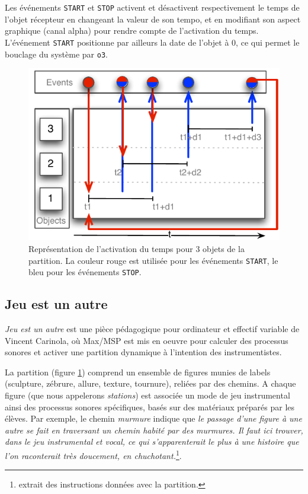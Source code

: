 \documentclass{article}
\newcommand{\OSC}[1]	{{\fontsize{9pt}{9pt} \selectfont\texttt{#1}}}
\begin{document}
Les événements \OSC{START} et \OSC{STOP} activent et désactivent respectivement le temps de l'objet récepteur en changeant la valeur de son tempo, et en modifiant son aspect graphique (canal alpha) pour rendre compte de l'activation du temps. L'événement \OSC{START} positionne par ailleurs la date de l'objet à 0, ce qui permet le bouclage du système par \OSC{o3}.
\begin{figure}[h]
   \centering
   \includegraphics[width=0.8\columnwidth]{imgs/sample}
   \caption{Représentation de l'activation du temps pour 3 objets de la partition. La couleur rouge est utilisée pour les événements \OSC{START}, le bleu pour les événements \OSC{STOP}.}
   \label{fig:sample}
\end{figure}


\subsection{Jeu est un autre}

\emph{Jeu est un autre} est une pièce pédagogique pour ordinateur et effectif variable de Vincent Carinola, où Max/MSP est mis en oeuvre pour calculer des processus sonores et activer une partition dynamique à l'intention des instrumentistes. 

La partition (figure \ref{fig:sample}) comprend un ensemble de figures munies de labels (sculpture, zébrure, allure, texture, tournure), reliées par des chemins. A chaque figure (que nous appelerons \emph{stations}) est associée un mode de jeu instrumental ainsi des processus sonores spécifiques, basés sur des matériaux préparés par les élèves. Par exemple, le chemin \emph{murmure} indique que \emph{le passage d'une figure à une autre se fait en traversant un chemin habité par des murmures. Il faut ici trouver, dans le jeu instrumental et vocal, ce qui s'apparenterait le plus à une histoire que l'on raconterait très doucement, en chuchotant.}\footnote{extrait des instructions données avec la partition.}.
\end{document}
